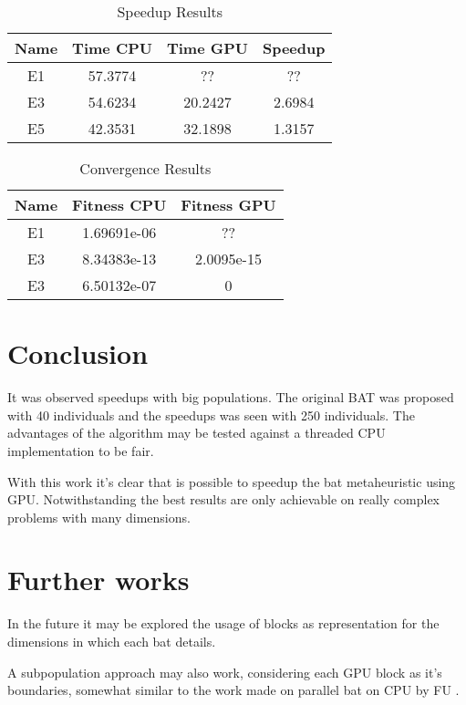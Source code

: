 \documentclass[conference]{IEEEtran}
\begin{document}
\begin{table}[!t]
    \renewcommand{\arraystretch}{1.3}
    \caption{Speedup Results}
    \label{results}
    \centering
    \begin{tabular}{c|c|c|c}
    \hline
        \bf Name & Time CPU & Time GPU & Speedup\\
    \hline
        E1 & 57.3774 & ?? & ?? \\
        E3 & 54.6234 & 20.2427 & 2.6984 \\
        E5 & 42.3531 & 32.1898 & 1.3157 \\
    \end{tabular}
\end{table}

\begin{table}[!t]
    \renewcommand{\arraystretch}{1.3}
    \caption{Convergence Results}
    \label{results}
    \centering
    \begin{tabular}{c|c|c}
    \hline
        \bf Name & Fitness CPU & Fitness GPU \\
    \hline
        E1 & 1.69691e-06 & ?? \\
        E3 & 8.34383e-13 &  2.0095e-15  \\
        E3 & 6.50132e-07 & 0 \\
    \end{tabular}
\end{table}

\section{Conclusion}

It was observed speedups with big populations. The original BAT was
proposed with 40 individuals and the speedups was seen with 250
individuals.
The advantages of the algorithm may be tested against a threaded CPU implementation to be fair.

With this work it's clear that is possible to speedup the bat metaheuristic using GPU. Notwithstanding the best results are only achievable on really complex problems with many dimensions.

\section{Further works}

In the future it may be explored the usage of blocks as representation for the
dimensions in which each bat details.

A subpopulation approach may also work, considering each GPU block as it's boundaries, somewhat similar to the work made on parallel bat on CPU by FU \cite{paralellCPU}.
\end{document}
